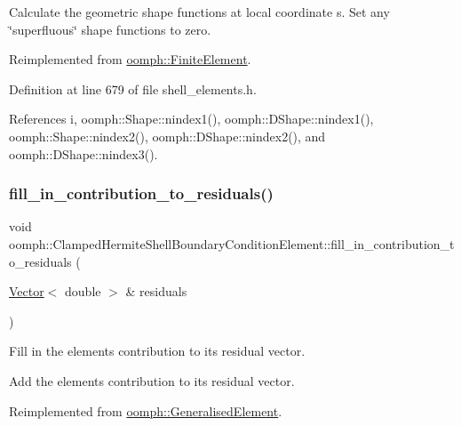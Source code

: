 Calculate the geometric shape functions at local coordinate s. Set any \char`\"{}superfluous\char`\"{} shape functions to zero. 



Reimplemented from \hyperlink{classoomph_1_1FiniteElement_a9db1456b827131c21a991ac9fedf4b0c}{oomph\+::\+Finite\+Element}.



Definition at line 679 of file shell\+\_\+elements.\+h.



References i, oomph\+::\+Shape\+::nindex1(), oomph\+::\+D\+Shape\+::nindex1(), oomph\+::\+Shape\+::nindex2(), oomph\+::\+D\+Shape\+::nindex2(), and oomph\+::\+D\+Shape\+::nindex3().

\mbox{\label{classoomph_1_1ClampedHermiteShellBoundaryConditionElement_ab50bd8d39186b633c398c508f9caf7fb}} 
\subsubsection{\texorpdfstring{fill\+\_\+in\+\_\+contribution\+\_\+to\+\_\+residuals()}{fill\_in\_contribution\_to\_residuals()}}
{\footnotesize\ttfamily void oomph\+::\+Clamped\+Hermite\+Shell\+Boundary\+Condition\+Element\+::fill\+\_\+in\+\_\+contribution\+\_\+to\+\_\+residuals (\begin{DoxyParamCaption}\item[{\hyperlink{classoomph_1_1Vector}{Vector}$<$ double $>$ \&}]{residuals }\end{DoxyParamCaption})\hspace{0.3cm}{\ttfamily [virtual]}}



Fill in the element\textquotesingle{}s contribution to its residual vector. 

Add the element\textquotesingle{}s contribution to its residual vector. 

Reimplemented from \hyperlink{classoomph_1_1GeneralisedElement_a310c97f515e8504a48179c0e72c550d7}{oomph\+::\+Generalised\+Element}.



